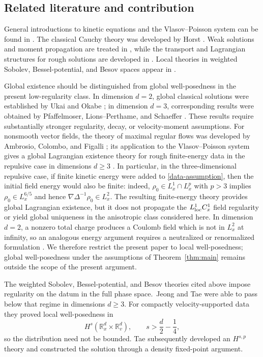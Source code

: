 \documentclass[11pt]{article}
\newcommand{\R}{\mathbb R}
\begin{document}
\subsection{Related literature and contribution}

General introductions to kinetic equations and the Vlasov--Poisson system can
be found in \cite{BGP,Glassey,Rein07}.  The classical Cauchy theory was
developed by Horst \cite{Horst,Horst2}.  Weak solutions and moment propagation
are treated in \cite{Ars,CPallard}, while the transport and Lagrangian
structures for rough solutions are developed in
\cite{DiPernaLions,Lagrangian}.  Local theories in weighted Sobolev,
Bessel-potential, and Besov spaces appear in \cite{WFS1,WFS2,Besov}.


Global existence should be distinguished from global well-posedness
in the present low-regularity class.  In dimension $d=2$, global classical
solutions were
established by Ukai and Okabe \cite{UkaiOkabe}; in dimension $d=3$,
corresponding results were obtained by Pfaffelmoser, Lions--Perthame, and
Schaeffer \cite{Pfaffelmoser,LionsPerthame,Schaeffer}.  These results require
substantially stronger regularity, decay, or velocity-moment assumptions.
For nonsmooth vector fields, the theory of maximal regular
flows was developed by Ambrosio, Colombo, and Figalli
\cite{MaximalFlows}; its application to the Vlasov--Poisson system gives a
global Lagrangian existence theory for rough finite-energy data in the
repulsive case in dimensions $d\geq3$ \cite{Lagrangian}.  In particular, in
the three-dimensional repulsive case,
if finite kinetic energy were added to \eqref{data-assumption}, then the
initial field energy would also be finite: indeed,
$\rho_0\in L^1_x\cap L^p_x$ with $p>3$ implies
$\rho_0\in L^{6/5}_x$ and hence
$\nabla\Delta^{-1}\rho_0\in L^2_x$.  The resulting finite-energy theory
provides global Lagrangian existence, but it does not propagate the
$L^1_{\rm loc}C^1_x$ field regularity or yield global uniqueness in the
anisotropic class considered here.  In dimension $d=2$, a nonzero total
charge produces a Coulomb field which is not in $L^2_x$ at infinity, so an
analogous energy argument requires a neutralized or renormalized
formulation \cite[Remark~2.10]{Lagrangian}.  We therefore restrict the
present paper to local
well-posedness; global well-posedness under the assumptions of
Theorem~\ref{thm:main} remains outside the scope of the present argument.


The weighted Sobolev, Bessel-potential, and Besov theories
cited above impose regularity on the datum in the full phase space.\
Jeong and Tae
\cite{JT} were able to pass below that regime  in dimensions $d\geq3$.  For compactly
velocity-supported data they proved local well-posedness in
\begin{equation*}
 H^s(\R^d_x\times\R^d_v),\qquad s>\frac d2-\frac{1}{4},
\end{equation*}
so the distribution need not be bounded.  Tae \cite{Tae} subsequently
developed an $H^{s,p}$ theory and constructed the solution through a
density fixed-point argument.
\end{document}
